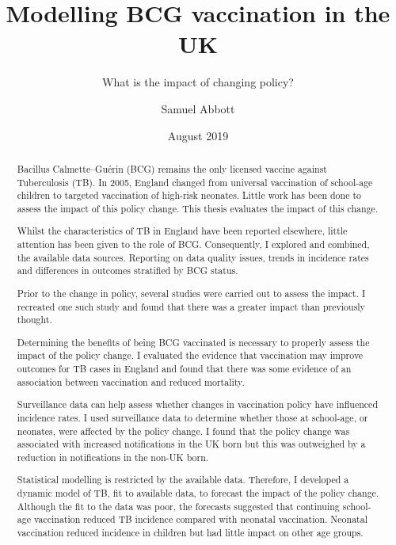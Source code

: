 \documentclass[11pt,twoside]{bristolthesis}
\title{Modelling BCG vaccination in the UK}
\subtitle{What is the impact of changing policy?}
\author{Samuel Abbott}
\date{August 2019}
\begin{document}
  \maketitle

  \frontmatter %

      \begin{abstract}
      Bacillus Calmette--Guérin (BCG) remains the only licensed vaccine against Tuberculosis (TB). In 2005, England changed from universal vaccination of school-age children to targeted vaccination of high-risk neonates. Little work has been done to assess the impact of this policy change. This thesis evaluates the impact of this change.
      
      \par
      
      Whilst the characteristics of TB in England have been reported elsewhere, little attention has been given to the role of BCG. Consequently, I explored and combined, the available data sources. Reporting on data quality issues, trends in incidence rates and differences in outcomes stratified by BCG status.
      
      \par
      
      Prior to the change in policy, several studies were carried out to assess the impact. I recreated one such study and found that there was a greater impact than previously thought.
      
      \par
      
      Determining the benefits of being BCG vaccinated is necessary to properly assess the impact of the policy change. I evaluated the evidence that vaccination may improve outcomes for TB cases in England and found that there was some evidence of an association between vaccination and reduced mortality.
      
      \par
      
      Surveillance data can help assess whether changes in vaccination policy have influenced incidence rates. I used surveillance data to determine whether those at school-age, or neonates, were affected by the policy change. I found that the policy change was associated with increased notifications in the UK born but this was outweighed by a reduction in notifications in the non-UK born.
      
      \par
      
      Statistical modelling is restricted by the available data. Therefore, I developed a dynamic model of TB, fit to available data, to forecast the impact of the policy change. Although the fit to the data was poor, the forecasts suggested that continuing school-age vaccination reduced TB incidence compared with neonatal vaccination. Neonatal vaccination reduced incidence in children but had little impact on other age groups.
      
      \par
    \end{abstract}
\end{document}
